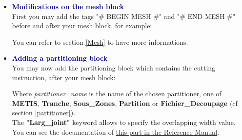 \begin{itemize}
\item \textbf{\textcolor{darkblue}{Modifications on the mesh block}}\\
First you may add the tags "\# BEGIN MESH \#" and "\# END MESH \#" before and after your mesh block, for example:
\begin{center}
\end{center}
You can refer to section \ref{Mesh} to have more informations.




\item \textbf{\textcolor{darkblue}{Adding a partitioning block}}\\
You may now add the partitioning block which contains the cutting instruction, after your mesh block:
\begin{center}
\end{center}
Where \textit{partitioner\_name} is the name of the chosen partitioner, one of \textbf{METIS}, \textbf{Tranche}, \textbf{Sous\_Zones}, \textbf{Partition} or \textbf{Fichier\_Decoupage} (cf section \ref{partitioner}).\\
The \textbf{"Larg\_joint"} keyword allows to specify the overlapping width value.
You can see the documentation of \href{\REFERENCEMANUAL\#partition}{this part in the \trustref Reference Manual}.\\


\end{itemize}
